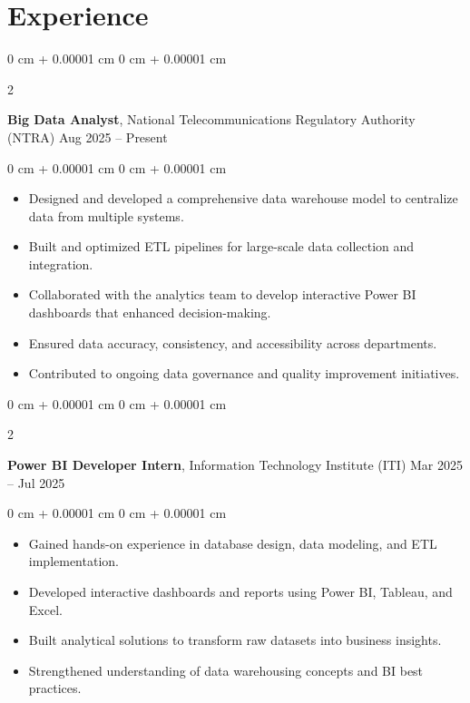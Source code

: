 \documentclass[10pt, letterpaper]{article}
\newenvironment{highlights}{
    \begin{itemize}[
        topsep=0.10 cm,
        parsep=0.10 cm,
        partopsep=0pt,
        itemsep=0pt,
        leftmargin=0 cm + 10pt
    ]
}{
    \end{itemize}
} %
\newenvironment{onecolentry}{
    \begin{adjustwidth}{
        0 cm + 0.00001 cm
    }{
        0 cm + 0.00001 cm
    }
}{
    \end{adjustwidth}
} %
\newenvironment{twocolentry}[2][]{
    \onecolentry
    \def\secondColumn{#2}
    \setcolumnwidth{\fill, 4.5 cm}
    \begin{paracol}{2}
}{
    \switchcolumn \raggedleft \secondColumn
    \end{paracol}
    \endonecolentry
} %
\begin{document}
    \section{Experience}        
        \begin{twocolentry}{
            Aug 2025 – Present
        }
            \textbf{Big Data Analyst}, National Telecommunications Regulatory Authority (NTRA) \end{twocolentry}
        \vspace{0.2 cm}
        
        \begin{onecolentry}
            \begin{highlights}
                \item Designed and developed a comprehensive data warehouse model to centralize data from multiple systems.
                \item Built and optimized ETL pipelines for large-scale data collection and integration.
                \item Collaborated with the analytics team to develop interactive Power BI dashboards that enhanced decision-making.
                \item Ensured data accuracy, consistency, and accessibility across departments.
                \item Contributed to ongoing data governance and quality improvement initiatives.
            \end{highlights}
        \end{onecolentry}
        \vspace{0.2 cm}

        \begin{twocolentry}{
            Mar 2025 – Jul 2025
        }
        \textbf{Power BI Developer Intern}, Information Technology Institute (ITI) \end{twocolentry}

        \vspace{0.10 cm}
        \begin{onecolentry}
            \begin{highlights}
                \item Gained hands-on experience in database design, data modeling, and ETL implementation.
                \item Developed interactive dashboards and reports using Power BI, Tableau, and Excel.
                \item Built analytical solutions to transform raw datasets into business insights.
                \item Strengthened understanding of data warehousing concepts and BI best practices.
            \end{highlights}
        \end{onecolentry}
\end{document}
